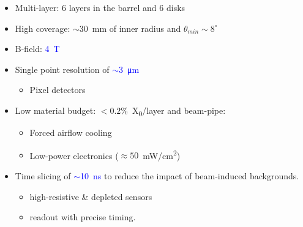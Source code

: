 \begin{frame}
\begin{columns}
    \begin{itemize}
    \item Multi-layer: 6 layers in the barrel and 6 disks
    \item High coverage: $\sim30$~mm of inner radius and
      $\theta_{min}\sim8^{\circ}$
    \item B-field: \textcolor{Blue}{4~T}
    \item Single point resolution of
      \textcolor{Blue}{$\sim$\SI{3}{\micro\meter}}
      \begin{itemize}
      \item Pixel detectors
      \end{itemize}
    \item Low material budget: $<0.2\%$~X\textsubscript{0}/layer and
      beam-pipe:
      \begin{itemize}
      \item Forced airflow cooling
      \item Low-power electronics
        ($\approx 50$~mW/cm\textsuperscript{2})
      \end{itemize}
    \item Time slicing of \textcolor{Blue}{$\sim$\SI{10}{\nano\second}}
      to reduce the impact of beam-induced backgrounds.
      \begin{itemize}
      \item high-resistive \& depleted sensors
      \item readout with precise timing.
      \end{itemize}
    \end{itemize}


    \centering


\end{columns}
\end{frame}
